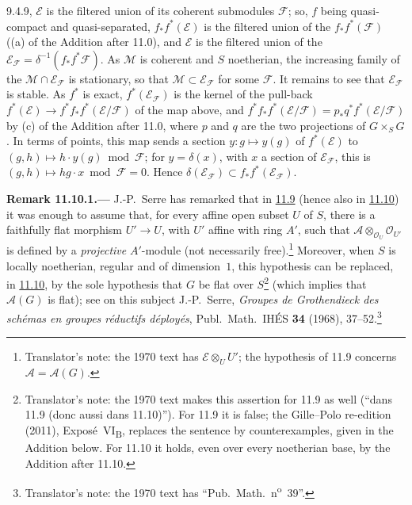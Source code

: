 9.4.9, \(\mathcal E\) is the filtered union of its coherent submodules \(\mathcal F\); so, \(f\) being
quasi-compact and quasi-separated, \(f_*f^*(\mathcal E)\) is the filtered union of the \(f_*f^*(\mathcal F)\) ((a) of
the Addition after 11.0), and \(\mathcal E\) is the filtered union of the
\(\mathcal E_{\mathcal F}=\delta^{-1}(f_*f^*\mathcal F)\). As \(\mathcal M\) is coherent and \(S\) noetherian, the
increasing family of the \(\mathcal M\cap\mathcal E_{\mathcal F}\) is stationary, so that
\(\mathcal M\subset\mathcal E_{\mathcal F}\) for some \(\mathcal F\). It remains to see that \(\mathcal E_{\mathcal F}\)
is stable. As \(f^*\) is exact, \(f^*(\mathcal E_{\mathcal F})\) is the kernel of the pull-back
\(f^*(\mathcal E)\to f^*f_*f^*(\mathcal E/\mathcal F)\) of the map above, and
\(f^*f_*f^*(\mathcal E/\mathcal F)=p_*q^*f^*(\mathcal E/\mathcal F)\) by (c) of the Addition after 11.0, where \(p\) and
\(q\) are the two projections of \(G\times_SG\). In terms of points, this map sends a section \(y\colon g\mapsto
y(g)\) of \(f^*(\mathcal E)\) to \((g,h)\mapsto h\cdot y(g)\bmod\mathcal F\); for \(y=\delta(x)\), with \(x\) a section
of \(\mathcal E_{\mathcal F}\), this is \((g,h)\mapsto hg\cdot x\bmod\mathcal F=0\). Hence
\(\delta(\mathcal E_{\mathcal F})\subset f_*f^*(\mathcal E_{\mathcal F})\).

\medskip
{}\label{rem:sga3-VIB-11.10.1}%
\noindent\textbf{Remark 11.10.1.---}
J.-P.~Serre has remarked that in
\hyperref[prop:sga3-VIB-11.9]{11.9} \textup{(}hence also in
\hyperref[cor:sga3-VIB-11.10]{11.10}\textup{)} it was enough to
assume that, for every affine open subset \(U\) of \(S\), there
is a faithfully flat morphism \(U'\to U\), with \(U'\) affine
with ring \(A'\), such that
\(\mathcal A\otimes_{\mathcal O_U}\mathcal O_{U'}\) is defined by
a \emph{projective} \(A'\)-module \textup{(}not necessarily
free\textup{)}.\footnote{Translator's note: the 1970 text has
\(\mathcal E\otimes_UU'\); the hypothesis of 11.9 concerns
\(\mathcal A=\mathcal A(G)\).} Moreover, when \(S\) is locally
noetherian, regular and of dimension~\(1\), this hypothesis can
be replaced, in \hyperref[cor:sga3-VIB-11.10]{11.10}, by the sole hypothesis that \(G\) be flat over
\(S\)\footnote{Translator's note: the 1970 text makes this assertion for 11.9 as well (``dans 11.9 (donc aussi
dans 11.10)''). For 11.9 it is false; the Gille--Polo re-edition (2011), Expos\'e~VI\textsubscript{B}, replaces the
sentence by counterexamples, given in the Addition below. For 11.10 it holds, even over every noetherian base, by
the Addition after 11.10.}
\textup{(}which implies that \(\mathcal A(G)\) is flat\textup{)};
see on this subject J.-P.~Serre, \emph{Groupes de Grothendieck
des sch\'emas en groupes r\'eductifs d\'eploy\'es}, Publ.\
Math.\ IH\'ES \textbf{34} (1968), 37--52.\footnote{Translator's
note: the 1970 text has ``Pub.\ Math.\ n\textsuperscript{o}~39''.}

